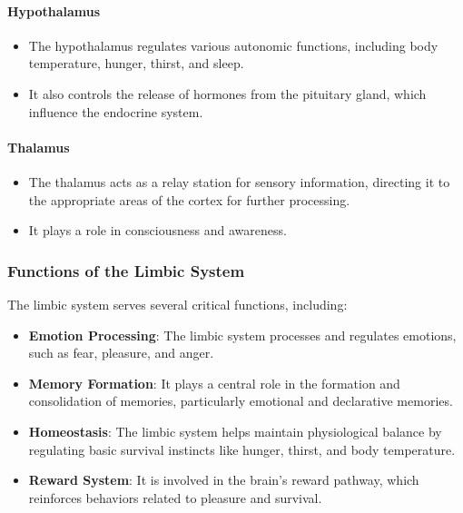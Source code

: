 \documentclass{article}
\begin{document}
\paragraph{Hypothalamus}

\begin{itemize}
  \item The hypothalamus regulates various autonomic functions, including body temperature, hunger, thirst, and sleep.
  \item It also controls the release of hormones from the pituitary gland, which influence the endocrine system.
\end{itemize}

\paragraph{Thalamus}

\begin{itemize}
  \item The thalamus acts as a relay station for sensory information, directing it to the appropriate areas of the cortex for further processing.
  \item It plays a role in consciousness and awareness.
\end{itemize}

\subsubsection{Functions of the Limbic System}

The limbic system serves several critical functions, including:

\begin{itemize}
  \item \textbf{Emotion Processing}: The limbic system processes and regulates emotions, such as fear, pleasure, and anger.
  \item \textbf{Memory Formation}: It plays a central role in the formation and consolidation of memories, particularly emotional and declarative memories.
  \item \textbf{Homeostasis}: The limbic system helps maintain physiological balance by regulating basic survival instincts like hunger, thirst, and body temperature.
  \item \textbf{Reward System}: It is involved in the brain's reward pathway, which reinforces behaviors related to pleasure and survival.
\end{itemize}
\end{document}
